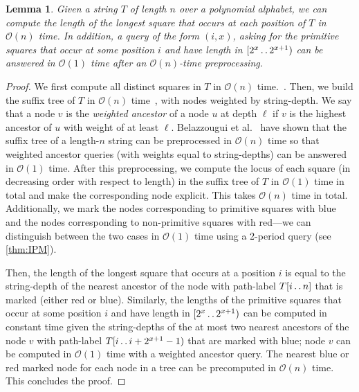 \documentclass[11pt,letterpaper]{article}
\newcommand{\cO}{\mathcal{O}}
\def\dd{\mathinner{.\,.}}
\newtheorem{lemma}[theorem]{Lemma}
\begin{document}
\begin{lemma}\label{lem:long_sq}
Given a string $T$ of length $n$ over a polynomial alphabet, we can compute the length of the longest square that occurs at each position of $T$ in $\cO(n)$ time.
In addition, a query of the form $(i,x)$, asking for the primitive squares that occur at some position $i$ and have length in $[2^x \dd 2^{x+1})$ can be answered in $\cO(1)$ time after an $\cO(n)$-time preprocessing.
\end{lemma}
\begin{proof}
We first compute all distinct squares in $T$ in $\cO(n)$ time.~\cite{BannaiIK17,CrochemoreIKRRW14}.
Then, we build the suffix tree of $T$ in $\cO(n)$ time~\cite{DBLP:conf/focs/Farach97}, with nodes weighted by string-depth.
We say that a node $v$ is the \emph{weighted ancestor} of a node $u$ at depth $\ell$ if $v$ is the highest ancestor of $u$ with weight of at least $\ell$.
Belazzougui et al.~\cite{DBLP:conf/cpm/BelazzouguiKPR21} have shown that the suffix tree of a length-$n$ string can be preprocessed in $\cO(n)$ time so that weighted ancestor queries (with weights equal to string-depths) can be answered in $\cO(1)$ time.
After this preprocessing, we compute the locus of each square (in decreasing order with respect to length) in the suffix tree of $T$ in $\cO(1)$ time in total and make the corresponding node explicit. This takes $\cO(n)$ time in total.
Additionally, we mark the nodes corresponding to primitive squares with blue and the nodes corresponding to non-primitive squares with red---we can distinguish between the two cases in $\cO(1)$ time using a 2-period query (see \cref{thm:IPM}).

Then, the length of the longest square that occurs at a position $i$ is equal to the string-depth of the nearest ancestor of the node with path-label $T[i \dd n]$ that is marked (either red or blue).
Similarly, the lengths of the primitive squares that occur at some position $i$ and have length in $[2^x \dd 2^{x+1})$ can be computed in constant time given the string-depths of the at most two nearest ancestors of the node $v$ with path-label $T[i \dd i+2^{x+1}-1)$ that are marked with blue; node $v$ can be computed in $\cO(1)$ time with a weighted ancestor query.
The nearest blue or red marked node for each node in a tree can be precomputed in $\cO(n)$ time. This concludes the proof.
\end{proof}


\end{document}

